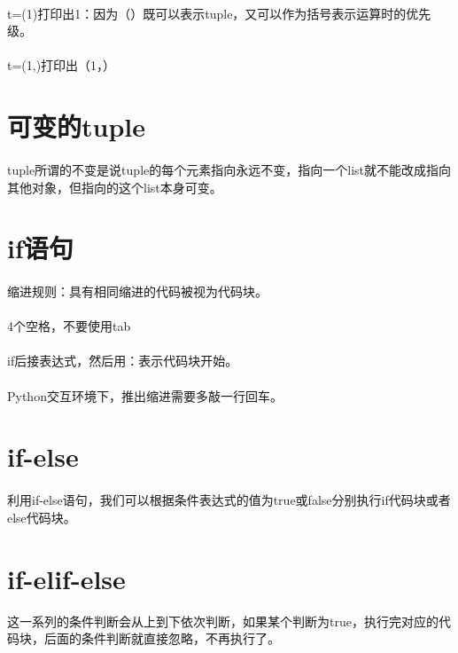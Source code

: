 \documentclass{article}
\begin{document}
\begin{CJK}{UTF8}{gbsn}
\paragraph{}
t=(1)打印出1：因为（）既可以表示tuple，又可以作为括号表示运算时的优先级。
\paragraph{}
t=(1,)打印出（1，）
\section{可变的tuple}
\paragraph{}
tuple所谓的不变是说tuple的每个元素指向永远不变，指向一个list就不能改成指向其他对象，但指向的这个list本身可变。
\section{if语句}
\paragraph{}
缩进规则：具有相同缩进的代码被视为代码块。
\paragraph{}
4个空格，不要使用tab
\paragraph{}
if后接表达式，然后用：表示代码块开始。
\paragraph{}
Python交互环境下，推出缩进需要多敲一行回车。
\section{if-else}
\paragraph{}
利用if-else语句，我们可以根据条件表达式的值为true或false分别执行if代码块或者else代码块。
\section{if-elif-else}
这一系列的条件判断会从上到下依次判断，如果某个判断为true，执行完对应的代码块，后面的条件判断就直接忽略，不再执行了。

\end{CJK}
\end{document}
